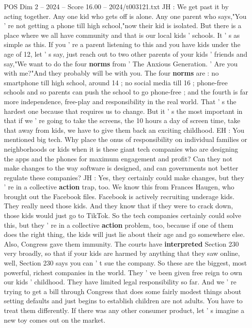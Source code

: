 \begin{textsample}{POS Dim 2 – 2024 – Score 16.00 – 2024/t003121.txt}
JH : We get past it by acting together.
Any one kid who gets off is alone.
Any one parent who says,"You ' re not getting a phone till high school,"now their kid is isolated.
But there is a place where we all have community and that is our local kids ' schools.
It ' s as simple as this.
If you ' re a parent listening to this and you have kids under the age of 12, let ' s say, just reach out to two other parents of your kids ' friends and say,"We want to do the four \textbf{norms} from ' The Anxious Generation. ' Are you with me?"And they probably will be with you.
The four \textbf{norms} are : no smartphone till high school, around 14 ; no social media till 16 ; phone-free schools and so parents can push the school to go phone-free ; and the fourth is far more independence, free-play and responsibility in the real world.
That ' s the hardest one because that requires us to change.
But it ' s the most important in that if we ' re going to take the screens, the 10 hours a day of screen time, take that away from kids, we have to give them back an exciting childhood.
EH : You mentioned big tech.
Why place the onus of responsibility on individual families or neighborhoods or kids when it is these giant tech companies who are designing the apps and the phones for maximum engagement and profit?
Can they not make changes to the way software is designed, and can governments not better regulate these companies?
JH : Yes, they certainly could make changes, but they ' re in a collective \textbf{action} trap, too.
We know this from Frances Haugen, who brought out the Facebook files.
Facebook is actively recruiting underage kids.
They really need those kids.
And they know that if they were to crack down, those kids would just go to TikTok.
So the tech companies certainly could solve this, but they ' re in a collective \textbf{action} problem, too, because if one of them does the right thing, the kids will just lie about their age and go somewhere else.
Also, Congress gave them immunity.
The courts have \textbf{interpreted} Section 230 very broadly, so that if your kids are harmed by anything that they saw online, well, Section 230 says you can ' t sue the company.
So these are the biggest, most powerful, richest companies in the world.
They ' ve been given free reign to own our kids ' childhood.
They have limited legal responsibility so far.
And we ' re trying to get a bill through Congress that does some fairly modest things about setting defaults and just begins to establish children are not adults.
You have to treat them differently.
If there was any other consumer product, let ' s imagine a new toy comes out on the market.

\end{textsample}
